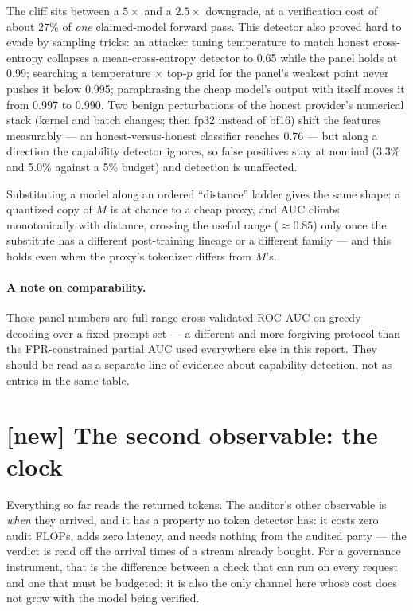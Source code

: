 \documentclass[11pt]{article}
\begin{document}
\noindent The cliff sits between a $5\times$ and a $2.5\times$ downgrade, at a
verification cost of about 27\% of \emph{one} claimed-model forward pass. This detector
also proved hard to evade by sampling tricks: an attacker tuning temperature to match
honest cross-entropy collapses a mean-cross-entropy detector to 0.65 while the panel
holds at 0.99; searching a temperature $\times$ top-$p$ grid for the panel's weakest
point never pushes it below 0.995; paraphrasing the cheap model's output with itself
moves it from 0.997 to 0.990. Two benign perturbations of the honest provider's
numerical stack (kernel and batch changes; then fp32 instead of bf16) shift the
features measurably --- an honest-versus-honest classifier reaches 0.76 --- but along a
direction the capability detector ignores, so false positives stay at nominal
(3.3\% and 5.0\% against a 5\% budget) and detection is unaffected.

Substituting a model along an ordered ``distance'' ladder gives the same shape: a
quantized copy of $M$ is at chance to a cheap proxy, and AUC climbs monotonically with
distance, crossing the useful range (${\approx}0.85$) only once the substitute has a
different post-training lineage or a different family --- and this holds even when the
proxy's tokenizer differs from $M$'s.

\paragraph{A note on comparability.} These panel numbers are full-range
cross-validated ROC-AUC on greedy decoding over a fixed prompt set --- a different and
more forgiving protocol than the FPR-constrained partial AUC used everywhere else in
this report. They should be read as a separate line of evidence about capability
detection, not as entries in the same table.

\section{[new] The second observable: the clock}
\label{sec:clock}

Everything so far reads the returned tokens. The auditor's other observable is
\emph{when} they arrived, and it has a property no token detector has: it costs
zero audit FLOPs, adds zero latency, and needs nothing from the audited party ---
the verdict is read off the arrival times of a stream already bought. For a
governance instrument, that is the difference between a check that can run on
every request and one that must be budgeted; it is also the only channel here
whose cost does not grow with the model being verified.
\end{document}
